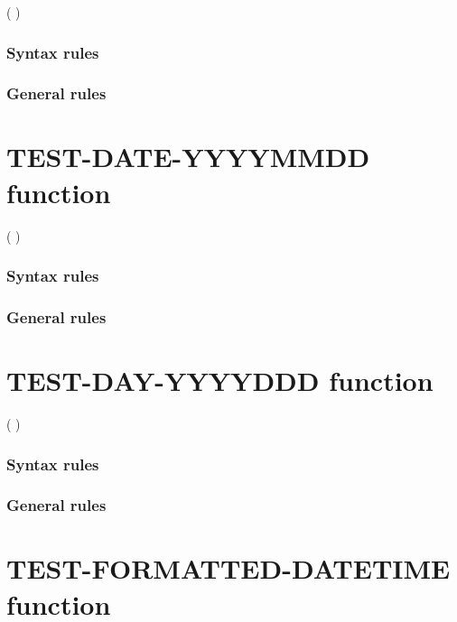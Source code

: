 \begin{syntax}
    ( \argument )
\end{syntax}

\subsubsection{Syntax rules}

\subsubsection{General rules}

\section{TEST-DATE-YYYYMMDD function}

\begin{syntax}
    ( \argument )
\end{syntax}

\subsubsection{Syntax rules}

\subsubsection{General rules}

\section{TEST-DAY-YYYYDDD function}

\begin{syntax}
    ( \argument )
\end{syntax}

\subsubsection{Syntax rules}

\subsubsection{General rules}

\section{TEST-FORMATTED-DATETIME function}

